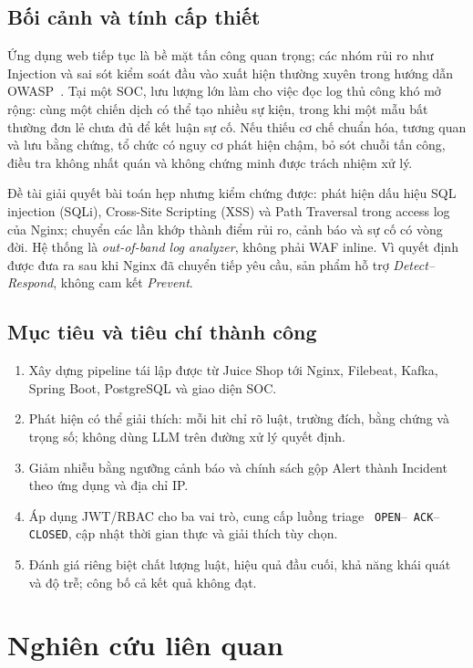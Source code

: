 \documentclass[runningheads]{report-template/llncs}
\newcommand{\code}[1]{\texttt{\small\hyphenchar\font=45 #1}}
\begin{document}
\subsection{Bối cảnh và tính cấp thiết}

Ứng dụng web tiếp tục là bề mặt tấn công quan trọng; các nhóm rủi ro như
Injection và sai sót kiểm soát đầu vào xuất hiện thường xuyên trong hướng
dẫn OWASP~\cite{owasptop10}. Tại một SOC, lưu lượng lớn làm cho việc đọc
log thủ công khó mở rộng: cùng một chiến dịch có thể tạo nhiều sự kiện,
trong khi một mẫu bất thường đơn lẻ chưa đủ để kết luận sự cố. Nếu thiếu
cơ chế chuẩn hóa, tương quan và lưu bằng chứng, tổ chức có nguy cơ phát
hiện chậm, bỏ sót chuỗi tấn công, điều tra không nhất quán và không chứng
minh được trách nhiệm xử lý.

Đề tài giải quyết bài toán hẹp nhưng kiểm chứng được: phát hiện dấu hiệu
SQL injection (SQLi), Cross-Site Scripting (XSS) và Path Traversal trong
access log của Nginx; chuyển các lần khớp thành điểm rủi ro, cảnh báo và
sự cố có vòng đời. Hệ thống là \emph{out-of-band log analyzer}, không phải
WAF inline. Vì quyết định được đưa ra sau khi Nginx đã chuyển tiếp yêu
cầu, sản phẩm hỗ trợ \emph{Detect--Respond}, không cam kết \emph{Prevent}.

\subsection{Mục tiêu và tiêu chí thành công}

\begin{enumerate}
  \item Xây dựng pipeline tái lập được từ Juice Shop tới Nginx, Filebeat,
  Kafka, Spring Boot, PostgreSQL và giao diện SOC.
  \item Phát hiện có thể giải thích: mỗi hit chỉ rõ luật, trường đích,
  bằng chứng và trọng số; không dùng LLM trên đường xử lý quyết định.
  \item Giảm nhiễu bằng ngưỡng cảnh báo và chính sách gộp Alert thành
  Incident theo ứng dụng và địa chỉ IP.
  \item Áp dụng JWT/RBAC cho ba vai trò, cung cấp luồng triage
  \code{OPEN}--\code{ACK}--\code{CLOSED}, cập nhật thời gian thực và
  giải thích tùy chọn.
  \item Đánh giá riêng biệt chất lượng luật, hiệu quả đầu cuối, khả năng
  khái quát và độ trễ; công bố cả kết quả không đạt.
\end{enumerate}

\section{Nghiên cứu liên quan}
\end{document}
